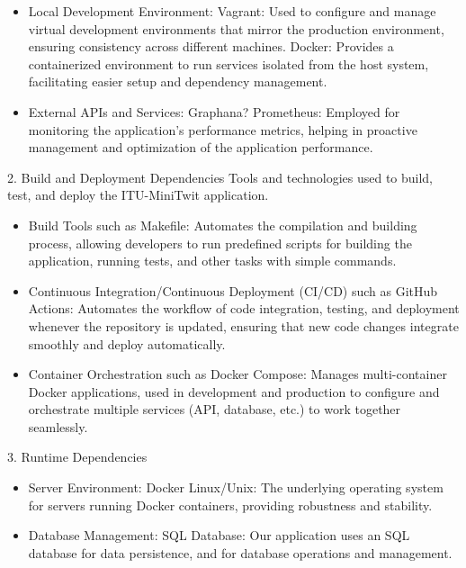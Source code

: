 \documentclass[12pt, a4paper, oneside]{book}
\begin{document}
\begin{spacing}{1.5}
\begin{itemize}
\item Local Development Environment:
    \subitem Vagrant: Used to configure and manage virtual development environments that mirror the production environment, ensuring consistency across different machines.
    \subitem Docker: Provides a containerized environment to run services isolated from the host system, facilitating easier setup and dependency management.


\item External APIs and Services:
    \subitem Graphana?
    \subitem Prometheus: Employed for monitoring the application’s performance metrics, helping in proactive management and optimization of the application performance.
\end{itemize}

2. Build and Deployment Dependencies
Tools and technologies used to build, test, and deploy the ITU-MiniTwit application.

\begin{itemize}

\item Build Tools such as Makefile: Automates the compilation and building process, allowing developers to run predefined scripts for building the application, running tests, and other tasks with simple commands.
\item Continuous Integration/Continuous Deployment (CI/CD) such as GitHub Actions: Automates the workflow of code integration, testing, and deployment whenever the repository is updated, ensuring that new code changes integrate smoothly and deploy automatically.
\item Container Orchestration such as Docker Compose: Manages multi-container Docker applications, used in development and production to configure and orchestrate multiple services (API, database, etc.) to work together seamlessly.
    
\end{itemize}

3. Runtime Dependencies

\begin{itemize}

\item Server Environment:
\subitem Docker
\subitem Linux/Unix: The underlying operating system for servers running Docker containers, providing robustness and stability.
\item Database Management: SQL Database: Our application uses an SQL database for data persistence, and for database operations and management.


\end{itemize}
\end{spacing}
\end{document}
